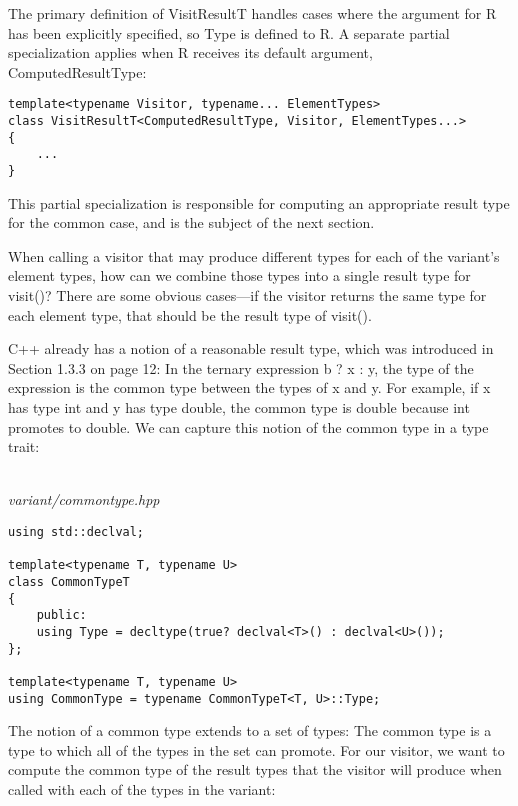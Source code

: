 The primary definition of VisitResultT handles cases where the argument for R has been explicitly specified, so Type is defined to R. A separate partial specialization applies when R receives its default argument, ComputedResultType:

\begin{lstlisting}[style=styleCXX]
template<typename Visitor, typename... ElementTypes>
class VisitResultT<ComputedResultType, Visitor, ElementTypes...>
{
	...
}
\end{lstlisting}

This partial specialization is responsible for computing an appropriate result type for the common case, and is the subject of the next section.


When calling a visitor that may produce different types for each of the variant’s element types, how can we combine those types into a single result type for visit()? There are some obvious cases—if the visitor returns the same type for each element type, that should be the result type of visit().

C++ already has a notion of a reasonable result type, which was introduced in Section 1.3.3 on page 12: In the ternary expression b ? x : y, the type of the expression is the common type between the types of x and y. For example, if x has type int and y has type double, the common type is double because int promotes to double. We can capture this notion of the common type in a type trait:

\hspace*{\fill} \\ %
\noindent
\textit{variant/commontype.hpp}
\begin{lstlisting}[style=styleCXX]
using std::declval;

template<typename T, typename U>
class CommonTypeT
{
	public:
	using Type = decltype(true? declval<T>() : declval<U>());
};

template<typename T, typename U>
using CommonType = typename CommonTypeT<T, U>::Type;
\end{lstlisting}

The notion of a common type extends to a set of types: The common type is a type to which all of the types in the set can promote. For our visitor, we want to compute the common type of the result types that the visitor will produce when called with each of the types in the variant:

